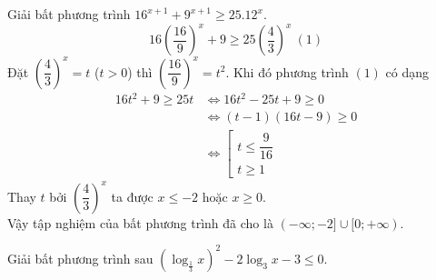 \begin{bt}%
	Giải bất phương trình $16^{x+1}+9^{x+1}\geq 25.12^x$.
	$$ 16\left(\dfrac{16}{9}\right)^x +9 \geq 25 \left(\dfrac{4}{3}\right)^x ~(1)$$
	Đặt $\left(\dfrac{4}{3}\right)^x=t$ ($t>0$) thì $\left(\dfrac{16}{9}\right)^x=t^2$. Khi đó phương trình $(1)$ có dạng 
	\begin{align*}
		16t^2+9 \geq 25t &\Leftrightarrow 16t^2-25t+9\geq 0
		\\ &\Leftrightarrow (t-1)(16t-9) \geq 0
		\\ &\Leftrightarrow \left[\begin{array}{ll}
			t \leq \dfrac{9}{16} \\ t\geq 1
		\end{array}\right.
	\end{align*}
	Thay $t$ bởi $\left(\dfrac{4}{3}\right)^x$ ta được $x\leq -2$ hoặc $x\geq 0$.
	\\ Vậy tập nghiệm của bất phương trình đã cho là $(-\infty;-2] \cup [0;+\infty)$.
\end{bt}

\begin{bt}%
	Giải bất phương trình sau $ \left(\log_{\frac{1}{3}} x\right)^2 -2\log_3 x-3 \leq 0$.
\end{bt}

